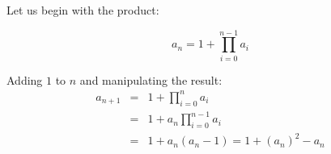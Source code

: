 \documentclass[12pt]{article}
\begin{document}
Let us begin with the product:

\[a_n = 1 + \prod_{i = 0}^{n - 1} a_i\]

Adding $1$ to $n$ and manipulating the result:
\begin{eqnarray*}
a_{n+1} &=& 1 + \prod_{i = 0}^n a_i \\
&=& 1 + a_n \prod_{i = 0}^{n - 1} a_i \\
&=& 1 + a_n (a_n - 1) = 1 + (a_n)^2 - a_n \\
\end{eqnarray*}
\end{document}
